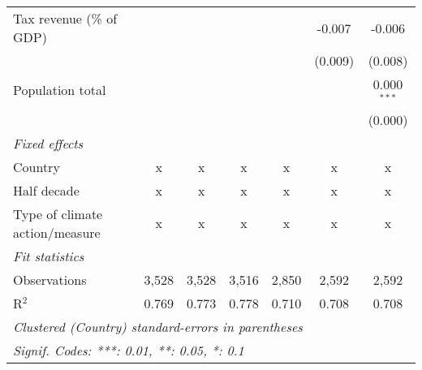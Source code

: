 \begin{tabular}{lcccccc}
   Tax revenue (\% of GDP)               &         &              &               &                & -0.007         & -0.006\\   
                                         &         &              &               &                & (0.009)        & (0.008)\\   
   Population total                      &         &              &               &                &                & 0.000$^{***}$\\   
                                         &         &              &               &                &                & (0.000)\\   
   \emph{Fixed effects}\\
   Country                               & x       & x            & x             & x              & x              & x\\  
   Half decade                           & x       & x            & x             & x              & x              & x\\  
   Type of climate action/measure        & x       & x            & x             & x              & x              & x\\  
   \midrule \emph{Fit statistics}\\
   Observations                          & 3,528   & 3,528        & 3,516         & 2,850          & 2,592          & 2,592\\  
   R$^2$                                 & 0.769   & 0.773        & 0.778         & 0.710          & 0.708          & 0.708\\  
   \midrule
   \multicolumn{7}{l}{\emph{Clustered (Country) standard-errors in parentheses}}\\
   \multicolumn{7}{l}{\emph{Signif. Codes: ***: 0.01, **: 0.05, *: 0.1}}\\
\end{tabular}
\par\endgroup


